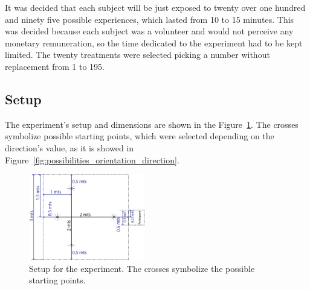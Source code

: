 It was decided that each subject will be just exposed to twenty over one hundred and ninety five possible experiences, which lasted  from 10 to 15 minutes. This was decided because each subject was a volunteer and would not perceive any monetary remuneration, so the time dedicated to the experiment had to be kept limited. The twenty treatments were selected picking a number without replacement from 1 to 195.

\subsection{Setup}

The experiment's setup and dimensions are shown in the Figure~\ref{fig:setup}. The crosses symbolize possible starting points, which were selected depending on the direction's value, as it is showed in Figure~\ref{fig:possibilities_orientation_direction}. 

\begin{figure}
	\centering
	\includegraphics[width=0.45\textwidth]{./Images/ExperimentGeneral.png} 
	\caption{Setup for the experiment. The crosses symbolize the possible starting points.}
	\label{fig:setup}
\end{figure} 